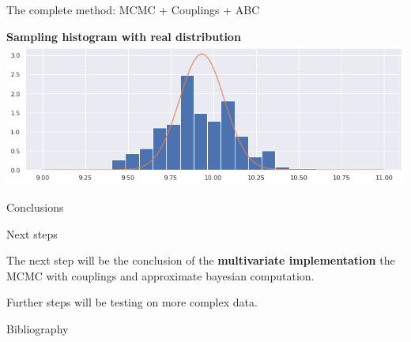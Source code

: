 \documentclass{beamer}
\begin{document}
\begin{section}{The complete method: MCMC + Couplings + ABC}
\begin{frame}
\begin{center}
			\begin{minipage}{0.63\textwidth}
				\begin{center}
					{\scriptsize \textbf{Sampling histogram with real distribution}}
					\includegraphics[width=\textwidth]{abc_coupling/histabccoupling}
				\end{center}
			\end{minipage}
		\end{center}
	\end{frame}


\end{section}


\begin{section}{Conclusions}
	
    \begin{frame}[plain]{}
		\sectionpage
	\end{frame}

	\begin{frame}{Next steps}
	
		The next step will be the conclusion of the \textbf{multivariate implementation} the MCMC with couplings and approximate bayesian computation.
		
		\vspace{0.5 cm}
		Further steps will be testing on more complex data.
	\end{frame}

	\begin{frame}{Bibliography}
		\nocite{*}
		
		\tiny{  }

	

	\end{frame}
\end{section}
\end{document}
